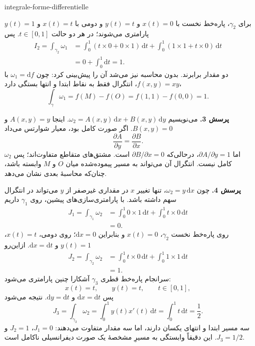 \begin{exo}{integrale-forme-differentielle}
\begin{solution}
برای $\gamma_2$، پاره‌خط نخست با $x(t)=0$ و $y(t)=t$ و دومی با
$x(t)=t$ و $y(t)=1$ پارامتری می‌شوند؛ در هر دو حالت $t\in[0,1]$. پس
\[
\begin{aligned}
I_2
= \int_{\gamma_2}\omega_1
&= \int_0^1\left(t\times 0+0\times 1\right)\,\mathrm{d}t
 + \int_0^1\left(1\times 1+t\times 0\right)\,\mathrm{d}t \\
&= 0+\int_0^1\mathrm{d}t = 1.
\end{aligned}
\]
دو مقدار برابرند. بدون محاسبه نیز می‌شد آن را پیش‌بینی کرد: چون
$\omega_1=\mathrm{d}f$ با $f(x,y)=xy$، انتگرال فقط به نقاط ابتدا و انتها بستگی دارد،
\[
\int_\gamma\omega_1=f(M)-f(O)=f(1,1)-f(0,0)=1.
\]

\textbf{پرسش 3.} می‌نویسیم $\omega_2=A(x,y)\,\mathrm{d}x+B(x,y)\,\mathrm{d}y$.
اینجا $A(x,y)=y$ و $B(x,y)=0$. اگر صورت کامل بود، معیار شوارتس می‌داد
\[
\frac{\partial A}{\partial y}=\frac{\partial B}{\partial x}.
\]
اما $\partial A/\partial y=1$، درحالی‌که $\partial B/\partial x=0$ است.
مشتق‌های متقاطع متفاوت‌اند؛ پس $\omega_2$ کامل نیست. انتگرال آن می‌تواند به
مسیر پیموده‌شده میان $O$ و $M$ وابسته باشد، چنان‌که محاسبهٔ بعدی نشان می‌دهد.

\textbf{پرسش 4.} چون $\omega_2=y\,\mathrm{d}x$، تنها تغییر $x$ در مقداری
غیرصفر از $y$ می‌تواند در انتگرال سهم داشته باشد. با پارامتری‌سازی‌های پیشین،
روی $\gamma_1$ داریم
\[
\begin{aligned}
J_1
=\int_{\gamma_1}\omega_2
&=\int_0^1 0\times 1\,\mathrm{d}t
  +\int_0^1 t\times 0\,\mathrm{d}t \\
&=0.
\end{aligned}
\]
روی پاره‌خط نخست $\gamma_2$، $x(t)=0$ و بنابراین $\mathrm{d}x=0$؛ روی
دومی، $x(t)=t$، $y(t)=1$ و $\mathrm{d}x=\mathrm{d}t$. ازاین‌رو
\[
\begin{aligned}
J_2
=\int_{\gamma_2}\omega_2
&=\int_0^1 t\times 0\,\mathrm{d}t
  +\int_0^1 1\times 1\,\mathrm{d}t \\
&=1.
\end{aligned}
\]
سرانجام پاره‌خط قطری $\gamma_3$ آشکارا چنین پارامتری می‌شود:
\[
x(t)=t,\qquad y(t)=t,\qquad t\in[0,1],
\]
پس $\mathrm{d}x=\mathrm{d}t$ و $\mathrm{d}y=\mathrm{d}t$. نتیجه می‌شود
\[
J_3
=\int_{\gamma_3}\omega_2
=\int_0^1 y(t)x'(t)\,\mathrm{d}t
=\int_0^1 t\,\mathrm{d}t
=\frac12.
\]
سه مسیر ابتدا و انتهای یکسان دارند، اما سه مقدار متفاوت می‌دهند:
$J_1=0$، $J_2=1$ و $J_3=1/2$. این دقیقاً وابستگی به مسیرِ مشخصهٔ یک صورت
دیفرانسیلی ناکامل است.
\end{solution}
\end{exo}

